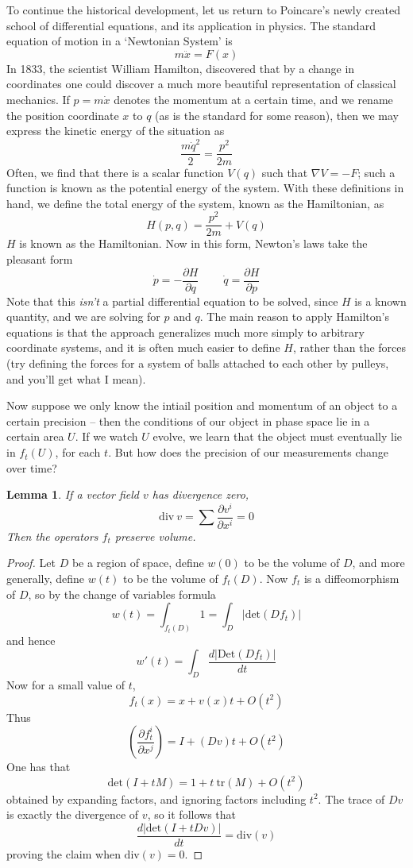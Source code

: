 \documentclass[12pt]{report}
\theoremstyle{plain}
\newtheorem{lemma}[theorem]{Lemma}
\theoremstyle{definition}
\begin{document}
To continue the historical development, let us return to Poincare's newly created school of differential equations, and its application in physics. The standard equation of motion in a `Newtonian System' is
%
\[ m \ddot{x} = F(x) \]
%
In 1833, the scientist William Hamilton, discovered that by a change in coordinates one could discover a much more beautiful representation of classical mechanics. If $p = m \dot{x}$ denotes the momentum at a certain time, and we rename the position coordinate $x$ to $q$ (as is the standard for some reason), then we may express the kinetic energy of the situation as
%
\[ \frac{m\dot{q}^2}{2} = \frac{p^2}{2m} \]
%
Often, we find that there is a scalar function $V(q)$ such that $\nabla V = - F$; such a function is known as the potential energy of the system. With these definitions in hand, we define the total energy of the system, known as the Hamiltonian, as
%
\[ H(p,q) = \frac{p^2}{2m} + V(q) \]
%
$H$ is known as the Hamiltonian. Now in this form, Newton's laws take the pleasant form
%
\[ \dot{p} = - \frac{\partial H}{\partial q}\ \ \ \ \ \ \ \ \ \ \dot{q} = \frac{\partial H}{\partial p} \]
%
Note that this {\it isn't} a partial differential equation to be solved, since $H$ is a known quantity, and we are solving for $p$ and $q$. The main reason to apply Hamilton's equations is that the approach generalizes much more simply to arbitrary coordinate systems, and it is often much easier to define $H$, rather than the forces (try defining the forces for a system of balls attached to each other by pulleys, and you'll get what I mean).


Now suppose we only know the intiail position and momentum of an object to a certain precision -- then the conditions of our object in phase space lie in a certain area $U$. If we watch $U$ evolve, we learn that the object must eventually lie in $f_t(U)$, for each $t$. But how does the precision of our measurements change over time?

\begin{lemma}
    If a vector field $v$ has divergence zero,
    \[ \text{div}\ v = \sum \frac{\partial v^i}{\partial x^i} = 0 \]
    Then the operators $f_t$ preserve volume.
\end{lemma}
\begin{proof}
    Let $D$ be a region of space, define $w(0)$ to be the volume of $D$, and more generally, define $w(t)$ to be the volume of $f_t(D)$. Now $f_t$ is a diffeomorphism of $D$, so by the change of variables formula
    \[ w(t) = \int_{f_t(D)} 1 = \int_{D} |\text{det} (Df_t) | \]
    and hence
    \[ w'(t) = \int_D \frac{d |\text{Det}(Df_t)|}{dt} \]
    Now for a small value of $t$,
    \[ f_t(x) = x + v(x)t + O(t^2) \]
    Thus
    \[ \left( \frac{\partial f^i_t}{\partial x^j} \right) = I + (Dv) t + O(t^2) \]
    One has that
    \[ \text{det}(I + t M) = 1 + t\ \text{tr}(M) + O(t^2) \]
    obtained by expanding factors, and ignoring factors including $t^2$. The trace of $Dv$ is exactly the divergence of $v$, so it follows that
    \[ \frac{d|\text{det}(I + t Dv)|}{dt} = \text{div}(v) \]
    proving the claim when $\text{div}(v) = 0$.
\end{proof}
\end{document}
